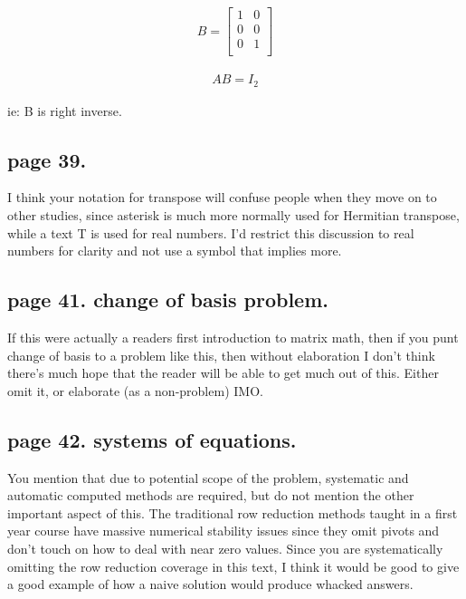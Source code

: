 \begin{align*}
B = 
\begin{bmatrix}
1 & 0 \\
0 & 0 \\
0 & 1 \\
\end{bmatrix}
\end{align*}

\begin{align*}
A B = I_2
\end{align*}

ie: B is right inverse.

\subsection{page 39. }

I think your notation for transpose will confuse people when they move on to other studies, since asterisk is much more normally used for Hermitian transpose,
while a text T is used for real numbers.  I'd restrict this discussion to real
numbers for clarity and not use a symbol that implies more.

\subsection{page 41. change of basis problem. }

If this were actually a readers first introduction to matrix math, then
if you punt change of basis to a problem like this, then without elaboration
I don't think there's much hope that the reader will be able to get much out
of this.  Either omit it, or elaborate (as a non-problem) IMO.

\subsection{page 42. systems of equations. }

You mention that due to potential scope of the problem, systematic and automatic computed methods are required, but do not mention the other important aspect of this.  The traditional row reduction methods taught in a first year course have massive numerical stability issues since they omit pivots and don't touch on how to deal with near zero values.  Since you are systematically omitting the row reduction coverage in this text, I think it would be good to give a good example of how a naive solution would produce whacked answers.

